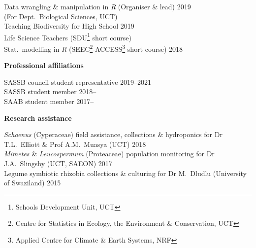 \documentclass[10pt]{article}
\begin{document}
\begin{multicols}{2}
Data wrangling \& manipulation in \textit{R} {\small (Organiser \& lead)}                       \hfill {\small             2019} \\
  \hspace{2em} {\small (For Dept.~Biological Sciences, UCT)} \\
Teaching Biodiversity for High School        \hfill {\small             2019}                                 \\
  \hspace{2em} Life Science Teachers {\small
  (SDU\footnote{Schools Development Unit,
  UCT} short course)}                         \\
Stat.~modelling in \textit{R} {\small
  (SEEC\footnote{Centre for Statistics in
  Ecology, the Environment \&
  Conservation, UCT}-ACCESS\footnote{Applied
  Centre for Climate \& Earth Systems, NRF}
  short course)}                             \hfill {\small             2018}


\textbf{Professional affiliations} %

SASSB council student representative               \hfill {\small 2019--2021} \\
SASSB student member                               \hfill {\small 2018--    } \\
SAAB student member                                \hfill {\small 2017--    } \\

\end{multicols} %

\textbf{Research assistance} %

\textit{Schoenus} (Cyperaceae)
  field assistance, collections \& hydroponics
  for Dr T.L.~Elliott \& Prof A.M.~Muasya
  {\small (UCT)}                                         \hfill {\small 2018} \\
\textit{Mimetes} \& \textit{Leucospermum} (Proteaceae)
  population monitoring
  for Dr J.A.~Slingsby
  {\small (UCT, SAEON)}                                  \hfill {\small 2017} \\
Legume symbiotic rhizobia
  collections \& culturing
  for Dr M.~Dludlu
  {\small (University of Swaziland)}                     \hfill {\small 2015}
\end{document}
